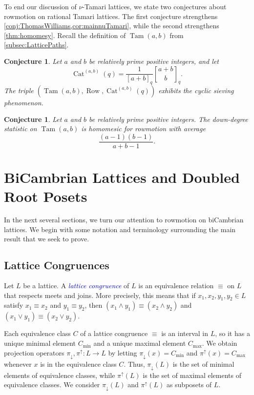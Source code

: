 \documentclass[11pt]{amsart}
\newtheorem{conjecture}[theorem]{Conjecture}
\theoremstyle{definition}
\DeclareMathOperator{\Tam}{Tam}
\DeclareMathOperator{\row}{Row}
\DeclareMathOperator{\Cat}{Cat}
\newcommand{\dfn}[1]{\textcolor{blue}{\emph{#1}}}
\begin{document}
To end our discussion of $\nu$-Tamari lattices, we state two conjectures about rowmotion on rational Tamari lattices. The first conjecture strengthens \cref{conj:ThomasWilliams,cor:mainnuTamari}, while the second strengthens \cref{thm:homomesy}. Recall the definition of $\Tam(a,b)$ from \cref{subsec:LatticePaths}.

\begin{conjecture}\label{THING2}
Let $a$ and $b$ be relatively prime positive integers, and let \[\Cat^{(a,b)}(q)=\frac{1}{[a+b]_q}{a+b\brack b}_q.\] The triple $(\Tam(a,b),\row,\Cat^{(a,b)}(q))$ exhibits the cyclic sieving phenomenon. 
\end{conjecture}

\begin{conjecture}\label{THING}
Let $a$ and $b$ be relatively prime positive integers. The down-degree statistic on $\Tam(a,b)$ is homomesic for rowmotion with average \[\frac{(a-1)(b-1)}{a+b-1}.\]  
\end{conjecture}


\section{BiCambrian Lattices and Doubled Root Posets}\label{Sec:BiCambrianDoubled}

In the next several sections, we turn our attention to rowmotion on biCambrian lattices. We begin with some notation and terminology surrounding the main result that we seek to prove.


\subsection{Lattice Congruences}\label{Subsec:Congruences}
Let $L$ be a lattice. A \dfn{lattice congruence} of $L$ is an equivalence relation $\equiv$ on $L$ that respects meets and joins. More precisely, this means that if $x_1,x_2,y_1,y_2\in L$ satisfy $x_1\equiv x_2$ and $y_1\equiv y_2$, then $(x_1\wedge y_1)\equiv(x_2\wedge y_2)$ and $(x_1\vee y_1)\equiv(x_2\vee y_2)$. 

Each equivalence class $C$ of a lattice congruence $\equiv$ is an interval in $L$, so it has a unique minimal element $C_{\min}$ and a unique maximal element $C_{\max}$. We obtain projection operators $\pi_\downarrow,\pi^\uparrow:L\to L$ by letting $\pi_\downarrow(x)=C_{\min}$ and $\pi^\uparrow(x)=C_{\max}$ whenever $x$ is in the equivalence class $C$. Thus, $\pi_\downarrow(L)$ is the set of minimal elements of equivalence classes, while $\pi^\uparrow(L)$ is the set of maximal elements of equivalence classes. We consider $\pi_\downarrow(L)$ and $\pi^\uparrow(L)$ as subposets of $L$.
\end{document}
